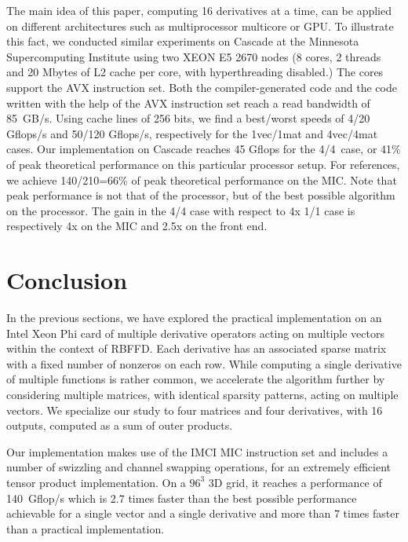 \documentclass{sig-alternate}
\def\NOTE#1{{}}
\def\ger#1{#1}
\begin{document}
\ger{The main idea of this paper, computing 16 derivatives at a time,
can be applied on different architectures such as multiprocessor
multicore or GPU. To illustrate this fact, we conducted similar experiments
on Cascade at the Minnesota Supercomputing Institute
using two XEON E5 2670 nodes (8 cores, 2 threads and 20 Mbytes of L2
cache per core, with hyperthreading disabled.) The cores support the AVX instruction set. 
Both the compiler-generated code and the code written with the 
help of the AVX instruction set reach a read bandwidth of
85~GB/s. Using cache lines of 256 bits, we find a best/worst speeds of 4/20\; Gflops/s and 
50/120\; Gflops/s, respectively for the 1vec/1mat and 4vec/4mat cases. 
Our implementation on Cascade reaches 45 Gflops for the 4/4\, case, or 41\% of peak theoretical 
performance on this particular processor setup. For references, we achieve 
140/210=66\% of peak theoretical performance on the MIC. Note that peak performance 
is not that of the processor, but of the best possible algorithm on the processor. 
The gain in the 4/4 case with respect to 4x 1/1 case is respectively 4x on the MIC 
and 2.5x on the front end.  
}

\vspace{-0.5em}
\section{Conclusion}
\label{sec:ccl}

In the previous sections, we have explored the practical
implementation on an Intel Xeon Phi card of multiple derivative
operators acting on multiple vectors within the context of
RBFFD. Each derivative has an associated sparse matrix with a fixed
number of nonzeros on each row. While computing a single derivative of
multiple functions is rather common, we accelerate the algorithm further 
by considering multiple
matrices, with identical sparsity patterns, acting on multiple vectors. 
We specialize our study to four matrices and four derivatives,
with 16 outputs, computed as a sum of outer products.

Our implementation makes use of the IMCI MIC instruction set and
includes a number of swizzling and channel swapping operations, for an
extremely efficient tensor product implementation. 
\NOTE{From Evan: this is the first time $96^3$ is mentionned. Might wish to mention 
it earlier.} On a $96^3$ 3D
grid, it reaches a performance of 140~Gflop/s which is 2.7 times
faster than the best possible performance achievable for a single
vector and a single derivative and more than 7 times faster than a
practical implementation.
\end{document}
